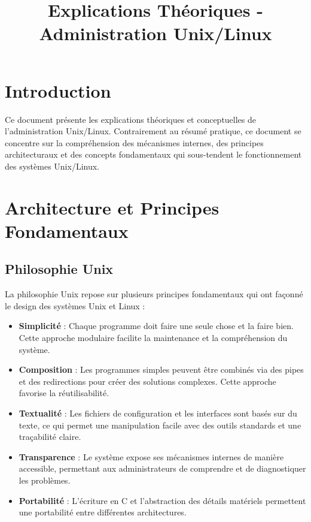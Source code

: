 \documentclass[12pt,a4paper]{article}
\title{\textbf{Explications Théoriques - Administration Unix/Linux}}
\author{}
\date{}
\begin{document}
\maketitle
\thispagestyle{fancy}

\section*{Introduction}
Ce document présente les explications théoriques et conceptuelles de l'administration Unix/Linux. Contrairement au résumé pratique, ce document se concentre sur la compréhension des mécanismes internes, des principes architecturaux et des concepts fondamentaux qui sous-tendent le fonctionnement des systèmes Unix/Linux.

\newpage
\tableofcontents
\newpage


\section{Architecture et Principes Fondamentaux}

\subsection{Philosophie Unix}

La philosophie Unix repose sur plusieurs principes fondamentaux qui ont façonné le design des systèmes Unix et Linux :

\begin{itemize}
    \item \textbf{Simplicité} : Chaque programme doit faire une seule chose et la faire bien. Cette approche modulaire facilite la maintenance et la compréhension du système.
    
    \item \textbf{Composition} : Les programmes simples peuvent être combinés via des pipes et des redirections pour créer des solutions complexes. Cette approche favorise la réutilisabilité.
    
    \item \textbf{Textualité} : Les fichiers de configuration et les interfaces sont basés sur du texte, ce qui permet une manipulation facile avec des outils standards et une traçabilité claire.
    
    \item \textbf{Transparence} : Le système expose ses mécanismes internes de manière accessible, permettant aux administrateurs de comprendre et de diagnostiquer les problèmes.
    
    \item \textbf{Portabilité} : L'écriture en C et l'abstraction des détails matériels permettent une portabilité entre différentes architectures.
\end{itemize}
\end{document}
